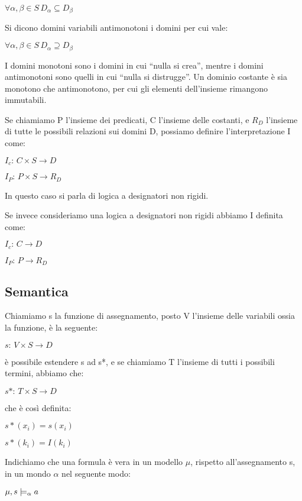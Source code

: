 $\forall\alpha,\beta\in S\, D_{\alpha}\subseteq D_{\beta}$

Si dicono domini variabili antimonotoni i domini per cui vale:

$\forall\alpha,\beta\in S\, D_{\alpha}\supseteq D_{\beta}$

I domini monotoni sono i domini in cui ``nulla si crea'', mentre
i domini antimonotoni sono quelli in cui ``nulla si distrugge''.
Un dominio costante è sia monotono che antimonotono, per cui gli elementi
dell'insieme rimangono immutabili.

Se chiamiamo P l'insieme dei predicati, C l'insieme delle costanti,
e $R_{D}$ l'insieme di tutte le possibili relazioni sui domini D,
possiamo definire l'interpretazione I come:

$I_{c}:\, C\times S\longrightarrow D$

$I_{P}:\, P\times S\longrightarrow R_{D}$

In questo caso si parla di logica a designatori non rigidi.

Se invece consideriamo una logica a designatori non rigidi abbiamo
I definita come:

$I_{c}:\, C\longrightarrow D$

$I_{P}:\, P\longrightarrow R_{D}$


\subsection{Semantica}

Chiamiamo s la funzione di assegnamento, posto V l'insieme delle variabili
ossia la funzione, è la seguente:

$s:\, V\times S\longrightarrow D$

è possibile estendere s ad s{*}, e se chiamiamo T l'insieme di tutti
i possibili termini, abbiamo che:

$s*:\, T\times S\longrightarrow D$

che è così definita:

$s*(x_{i})=s(x_{i})$

$s*(k_{i})=I(k_{i})$

Indichiamo che una formula è vera in un modello $\mu$, rispetto all'assegnamento
s, in un mondo $\alpha$ nel seguente modo:

$\mu,s\models_{\alpha}a$

